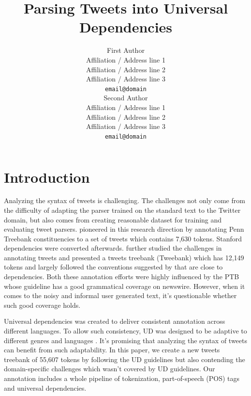 \documentclass[11pt,a4paper]{article}
\title{Parsing Tweets into Universal Dependencies}
\author{First Author \\
  Affiliation / Address line 1 \\
  Affiliation / Address line 2 \\
  Affiliation / Address line 3 \\
  {\tt email@domain} \\\And
  Second Author \\
  Affiliation / Address line 1 \\
  Affiliation / Address line 2 \\
  Affiliation / Address line 3 \\
  {\tt email@domain} \\}
\date{}
\begin{document}
\maketitle
\begin{abstract}

\end{abstract}

\section{Introduction}
Analyzing the syntax of tweets is challenging. The challenges not
only come from the difficulty of adapting the parser trained on the
standard text to the Twitter domain, but also comes from creating
reasonable dataset for training and evaluating tweet parsers. 
\citet{AAAIW113912} pioneered in this research direction by
annotating Penn Treebank \citep[PTB]{Marcus93buildinga}
constituencies to a set of tweets which contains 7,630 tokens. 
Stanford dependencies were converted afterwards. 
\citet{kong-EtAl:2014:EMNLP2014} further studied the challenges in
annotating tweets and presented a tweets treebank ({\sc Tweebank})
which has 12,149 tokens and largely followed the conventions
suggested by \citet{schneider-EtAl:2013:LAW7-ID} that are close to 
\citet{Yamada03statisticaldependency} dependencies. Both these
annotation efforts were highly influenced by the PTB whose guideline
has a good grammatical coverage on newswire. However, when it comes
to the noisy and informal user generated text, it's questionable
whether such good coverage holds.


Universal dependencies \citep[UD]{NIVRE16.348} was created to deliver
consistent annotation across different languages. To allow such
consistency, UD was designed to be adaptive to different genres and languages
\cite{guo-EtAl:2015:ACL-IJCNLP2,TACL892}. It's promising that analyzing
the syntax of tweets can benefit from such adaptability. In this paper,
we create a new tweets treebank of 55,607 tokens by following the UD
guidelines but also contending the domain-specific challenges which wasn't
covered by UD guidelines. Our annotation includes a whole pipeline of
tokenization, part-of-speech (POS) tags and universal dependencies.
\end{document}
